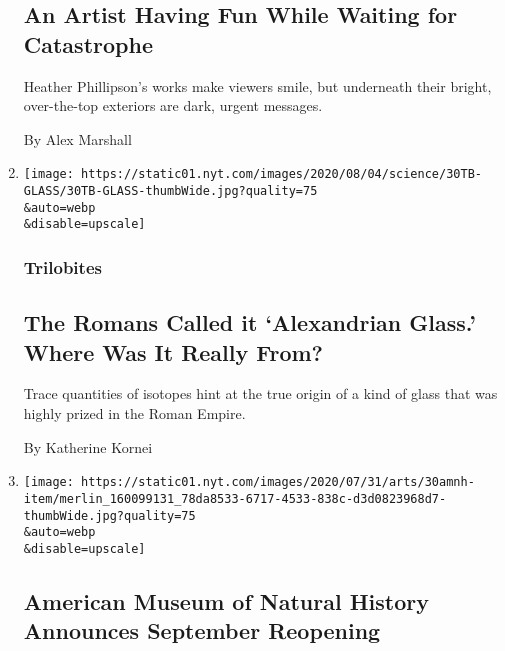 \begin{enumerate}
  \hypertarget{an-artist-having-fun-while-waiting-for-catastrophe}{%
  \subsection{An Artist Having Fun While Waiting for
  Catastrophe}\label{an-artist-having-fun-while-waiting-for-catastrophe}}

  Heather Phillipson's works make viewers smile, but underneath their
  bright, over-the-top exteriors are dark, urgent messages.

  By Alex Marshall
\item
  \href{/2020/07/31/science/alexandrian-glass-rome.html}{}

  \texttt{[image: https://static01.nyt.com/images/2020/08/04/science/30TB-GLASS/30TB-GLASS-thumbWide.jpg?quality=75\\\&auto=webp\\\&disable=upscale]}

  \hypertarget{trilobites}{%
  \subsubsection{Trilobites}\label{trilobites}}

  \hypertarget{the-romans-called-it-alexandrian-glass-where-was-it-really-from}{%
  \subsection{The Romans Called it `Alexandrian Glass.' Where Was It
  Really
  From?}\label{the-romans-called-it-alexandrian-glass-where-was-it-really-from}}

  Trace quantities of isotopes hint at the true origin of a kind of
  glass that was highly prized in the Roman Empire.

  By Katherine Kornei
\item
  \href{/2020/07/30/arts/design/american-museum-of-natural-history-reopen-covid.html}{}

  \texttt{[image: https://static01.nyt.com/images/2020/07/31/arts/30amnh-item/merlin\_160099131\_78da8533-6717-4533-838c-d3d0823968d7-thumbWide.jpg?quality=75\\\&auto=webp\\\&disable=upscale]}

  \hypertarget{american-museum-of-natural-history-announces-september-reopening}{%
  \subsection{American Museum of Natural History Announces September
  Reopening}\label{american-museum-of-natural-history-announces-september-reopening}}


\end{enumerate}
